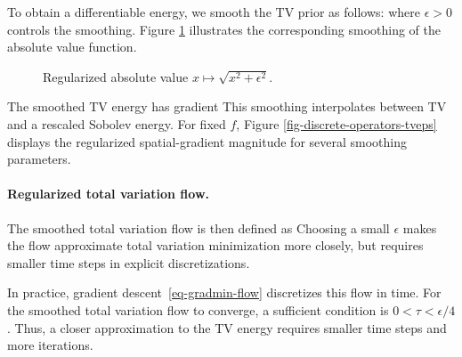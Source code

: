 To obtain a differentiable energy, we smooth the TV prior as follows:
where $\epsilon>0$ controls the smoothing. Figure \ref{fig-regul-abs} illustrates the corresponding smoothing of the absolute value function.


\begin{figure}[tbp]
\centering
{}\hfill
{}
\caption{Regularized absolute value $x \mapsto \sqrt{x^2+\epsilon^2}$.}
\label{fig-regul-abs}
\end{figure}

The smoothed TV energy has gradient
This smoothing interpolates between TV and a rescaled Sobolev energy. For fixed $f$,
Figure \ref{fig-discrete-operators-tveps} displays the regularized spatial-gradient magnitude for several smoothing parameters.



  
\paragraph{Regularized total variation flow.}

The smoothed total variation flow is then defined as
Choosing a small $\epsilon$ makes the flow approximate total variation minimization more closely, but requires smaller time steps in explicit discretizations.

In practice, gradient descent~\eqref{eq-gradmin-flow} discretizes this flow in time. For the smoothed total variation flow to converge, a sufficient condition is $0<\tau<\epsilon/4$. Thus, a closer approximation to the TV energy requires smaller time steps and more iterations.

